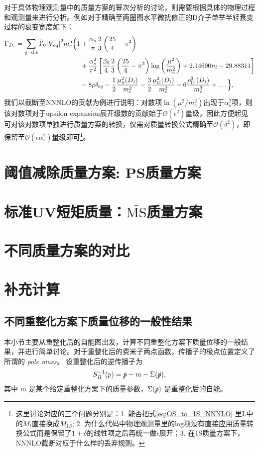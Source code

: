 对于具体物理观测量中的质量方案的幂次分析的讨论，则需要根据具体的物理过程和观测量来进行分析。例如对于精确至两圈图水平微扰修正的D介子单举半轻衰变过程的衰变宽度如下：
\begin{equation}
\begin{aligned}
    \Gamma_{D_{i}} = \sum_{q = \mathrm{d}, \mathrm{s}} \hat{\Gamma}_0 \mathrm{\left| V_{\mathrm{c}q} \right|^2} m_{\mathrm{c}}^5 \Big\{ 1 & + \frac{\alpha_s}{\pi} \frac{2}{3} \left( \frac{25}{4} - \pi^2 \right)\\
    & + \frac{\alpha_s^2}{\pi^2} \left[ \frac{\beta_0}{4} \frac{2}{3} \left( \frac{25}{4} - \pi^2 \right) \log \left( \frac{\mu^2}{m_{\mathrm{c}}^2} \right) + 2.14690 n_l - 29.88311 \right]\\  
    &- 8 \rho \delta_{\mathrm{s}q} - \frac{1}{2} \frac{\mu_{\pi}^{2}(D_{i})}{m_{\mathrm{c}}^2} - \frac{3}{2} \frac{\mu_{\mathrm{G}}^{2}(D_{i})}{m_{\mathrm{c}}^2} + 6 \frac{\rho_{\mathrm{D}}^3\left(D_{i}\right)}{m_{\mathrm{c}}^3} + \dots \Big\},
\end{aligned}
\label{eq:decaywidth-mass-scheme}
\end{equation}
我们以截断至NNNLO的贡献为例进行说明：对数项$\ln(\mu^2/m_{c}^2)$出现于$\alpha_s^2$项，则该对数项对于upsilon expansion展开级数的贡献始于$\mathcal{O}(\epsilon^2)$量级，因此方便起见可对该对数项单独进行质量方案的转换，仅需对质量转换公式精确至$\mathcal{O}(\delta^2)$，即保留至$\mathcal{O}(\epsilon \alpha_s^2)$量级即可\footnote{这里讨论对应的三个问题分别是：1. 能否把式\eqref{eq:OS_to_1S_NNNLO}
里L中的$M_{t}$直接换成$M_{1S}$; 2. 为什么代码中物理观测量里的log项没有直接应用质量转换公式而是保留了$1+\delta$的线性项之后再统一做$\epsilon$展开；3. 在1S质量方案下，NNNLO截断对应于什么样的丢弃规则。}。
\section{阈值减除质量方案: PS质量方案}
\section{标准UV短矩质量：$\bar{\text{MS}}$质量方案}
\section{不同质量方案的对比}
\newpage
\section{补充计算}
\subsection{不同重整化方案下质量位移的一般性结果}
本小节主要从重整化后的自能图出发，计算不同重整化方案下质量位移的一般结果，并进行简单讨论。对于重整化后的费米子两点函数，传播子的极点位置定义了所谓的 \emph{pole mass}。  
设重整化后的逆传播子为
\begin{equation}
S_R^{-1}(p)=\slashed p-m-\Sigma(\slashed p),
\end{equation}
其中 \(m\) 是某个给定重整化方案下的质量参数，\(\Sigma(\slashed p)\) 是重整化后的自能。

